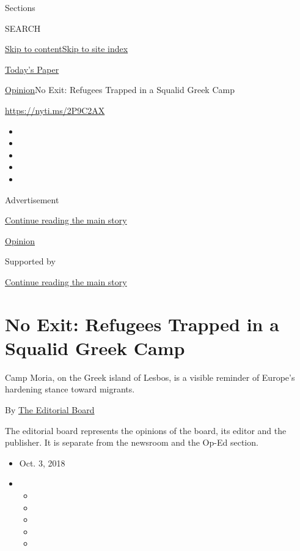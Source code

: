 Sections

SEARCH

\protect\hyperlink{site-content}{Skip to
content}\protect\hyperlink{site-index}{Skip to site index}

\href{https://myaccount.nytimes.com/auth/login?response_type=cookie\&client_id=vi}{}

\href{https://www.nytimes.com/section/todayspaper}{Today's Paper}

\href{/section/opinion}{Opinion}\textbar{}No Exit: Refugees Trapped in a
Squalid Greek Camp

\url{https://nyti.ms/2P9C2AX}

\begin{itemize}
\item
\item
\item
\item
\item
\end{itemize}

Advertisement

\protect\hyperlink{after-top}{Continue reading the main story}

\href{/section/opinion}{Opinion}

Supported by

\protect\hyperlink{after-sponsor}{Continue reading the main story}

\hypertarget{no-exit-refugees-trapped-in-a-squalid-greek-camp}{%
\section{No Exit: Refugees Trapped in a Squalid Greek
Camp}\label{no-exit-refugees-trapped-in-a-squalid-greek-camp}}

Camp Moria, on the Greek island of Lesbos, is a visible reminder of
Europe's hardening stance toward migrants.

By
\href{https://www.nytimes.com/interactive/opinion/editorialboard.html}{The
Editorial Board}

The editorial board represents the opinions of the board, its editor and
the publisher. It is separate from the newsroom and the Op-Ed section.

\begin{itemize}
\item
  Oct. 3, 2018
\item
  \begin{itemize}
  \item
  \item
  \item
  \item
  \item
  \end{itemize}
\end{itemize}

